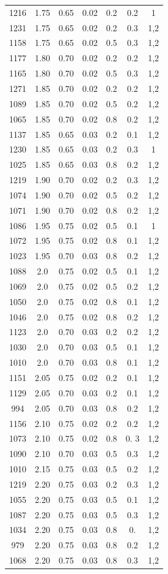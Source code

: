 \begin{longtable}{ccccccc}
1216&  1.75 &  0.65 &0.02&   0.2&  0.2  & 1\\
1231&  1.75 &  0.65 & 0.02 &  0.2&   0.3 & 1,2\\
1158&  1.75 &  0.65 & 0.02 &  0.5  & 0.3 & 1,2 \\
1177&  1.80&  0.70 &  0.02&  0.2  &   0.2 & 1,2 \\
1165&  1.80&  0.70 & 0.02 &   0.5 &  0.3 & 1,2 \\
1271&  1.85&  0.70 & 0.02 &  0.2 & 0.2   & 1,2 \\
1089&  1.85& 0.70&  0.02 &  0.5 &   0.2  & 1,2\\
1065&  1.85& 0.70 &  0.02& 0.8  &  0.2  & 1,2\\
1137&  1.85&  0.65&  0.03 &  0.2  & 0.1  & 1,2\\
1230&  1.85&  0.65& 0.03 &  0.2  & 0.3 & 1\\
1025&  1.85 &  0.65& 0.03 &  0.8 &  0.2 & 1,2 \\
1219& 1.90 & 0.70&  0.02&  0.2&  0.3  & 1,2\\
1074&  1.90&  0.70& 0.02 &  0.5&  0.2  & 1,2\\
1071&  1.90 &  0.70&  0.02&  0.8&  0.2  & 1,2\\
1086&  1.95 &  0.75&  0.02&  0.5& 0.1 & 1 \\
1072&  1.95 &  0.75&  0.02&  0.8& 0.1 & 1,2\\
1023&  1.95 &  0.70& 0.03& 0.8  & 0.2 & 1,2\\
1088&  2.0&  0.75&  0.02 &  0.5  & 0.1 & 1,2\\
1069&  2.0&  0.75&  0.02&  0.5  & 0.2 & 1,2\\
1050&  2.0&  0.75&  0.02&  0.8  & 0.1 & 1,2\\
1046&  2.0 & 0.75 & 0.02 &  0.8  & 0.2  & 1,2\\
1123&  2.0 &  0.70&  0.03&  0.2  & 0.2 & 1,2\\
1030&  2.0 &  0.70&  0.03& 0.5  & 0.1 & 1,2\\
1010&  2.0&  0.70&  0.03& 0.8  & 0.1 & 1,2\\
1151&  2.05& 0.75 & 0.02 &  0.2& 0.1 & 1,2\\
1129&  2.05&  0.70& 0.03 & 0.2 & 0.1 & 1,2\\
994&  2.05&  0.70&  0.03&  0.8  &0.2 & 1,2\\
1156&  2.10&  0.75&  0.02&  0.2  & 0.2 & 1,2\\
1073&  2.10&  0.75&  0.02&  0.8  & 0. 3& 1,2\\
1090& 2.10 &  0.70&  0.03&  0.5& 0.3 & 1,2\\
1010 & 2.15 &  0.75 &  0.03 & 0.5  & 0.2 & 1,2\\
1219&  2.20&  0.75&  0.03&  0.2  & 0.3  & 1,2\\
1055&  2.20&  0.75& 0.03 &  0.5  & 0.1 & 1,2\\
1087&  2.20& 0.75 &  0.03&  0.5  & 0.3 & 1,2\\
1034&  2.20& 0.75 &  0.03&  0.8  &0. & 1,2\\
979 &  2.20&  0.75 &  0.03& 0.8  & 0.2 & 1,2\\
1068&  2.20& 0.75 & 0.03  & 0.8   & 0.3 & 1,2\\ \bottomrule
\end{longtable}
